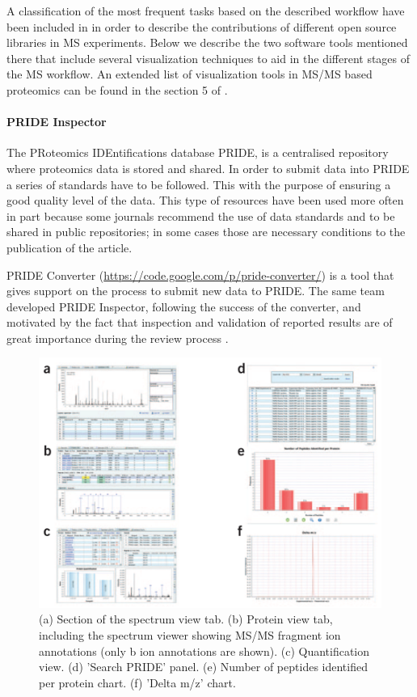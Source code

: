 A classification of the most frequent tasks based on the described workflow have been included in \cite{PER2014} in order to describe the contributions of different open source libraries in MS experiments. Below we describe the two software tools mentioned there that include several visualization techniques to aid in the different stages of the MS workflow. An extended list of visualization tools in MS/MS based proteomics can be found in the section 5 of \cite{JAC2010}.

\paragraph{PRIDE Inspector}
The PRoteomics IDEntifications database PRIDE, is a centralised repository where proteomics data is stored and shared. In order to submit data into PRIDE a series of standards have to be followed. This with the purpose of ensuring a good quality level of  the data. This type of resources have been used more often in part because some journals recommend the use of data standards and to be shared in public repositories; in some cases those are necessary conditions to the publication of the article.

PRIDE Converter  (\url{https://code.google.com/p/pride-converter/}) is a tool that gives support on the process to submit new data to PRIDE. The same team developed PRIDE Inspector, following the success of the converter, and motivated by the fact that inspection and validation of reported results are of great importance during the review process \cite{WAN2012}.

\begin{figure}  
\centering
\includegraphics[width=\textwidth]{figures/prideinspector.png}
\caption[Views on the PRIDE inspector toolset.]{(a) Section of the spectrum view tab. (b) Protein view tab, including the spectrum viewer showing MS/MS fragment ion annotations (only b ion annotations are shown). (c) Quantification view. (d) 'Search PRIDE' panel. (e) Number of peptides identified per protein chart. (f) 'Delta m/z' chart.
\label{fig:pride}}
\end{figure}

